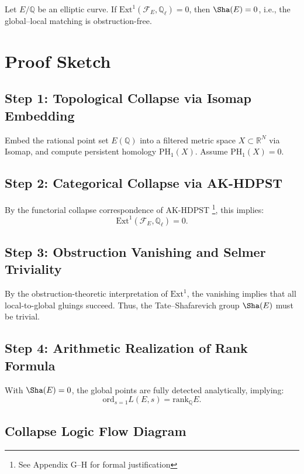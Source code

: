 \begin{lemma}
Let \( E/\mathbb{Q} \) be an elliptic curve.  
If \( \mathrm{Ext}^1(\mathcal{F}_E, \mathbb{Q}_\ell) = 0 \), then \( \Sha(E) = 0 \), i.e., the global–local matching is obstruction-free.
\end{lemma}

\section{Proof Sketch}

\subsection{Step 1: Topological Collapse via Isomap Embedding}
Embed the rational point set \( E(\mathbb{Q}) \) into a filtered metric space \( X \subset \mathbb{R}^N \) via Isomap, and compute persistent homology \( \mathrm{PH}_1(X) \).  
Assume \( \mathrm{PH}_1(X) = 0 \).

\subsection{Step 2: Categorical Collapse via AK-HDPST}
By the functorial collapse correspondence of AK-HDPST \footnote{See Appendix G--H for formal justification}, this implies:
\[
\mathrm{Ext}^1(\mathcal{F}_E, \mathbb{Q}_\ell) = 0.
\]

\subsection{Step 3: Obstruction Vanishing and Selmer Triviality}
By the obstruction-theoretic interpretation of \( \mathrm{Ext}^1 \), the vanishing implies that all local-to-global gluings succeed.  
Thus, the Tate--Shafarevich group \( \Sha(E) \) must be trivial.

\subsection{Step 4: Arithmetic Realization of Rank Formula}
With \( \Sha(E) = 0 \), the global points are fully detected analytically, implying:
\[
\mathrm{ord}_{s=1}L(E,s) = \mathrm{rank}_\mathbb{Q}E.
\]

\subsection{Collapse Logic Flow Diagram}
\begin{center}
\end{center}

